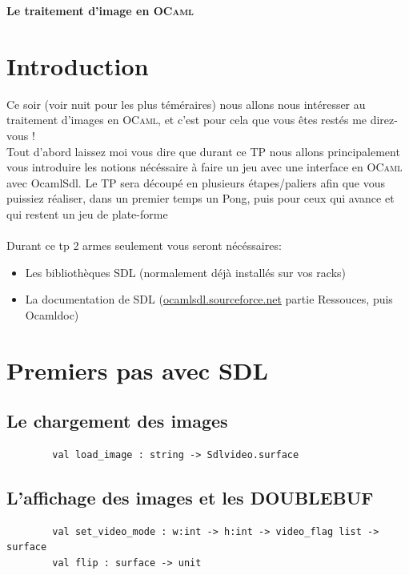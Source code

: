 \documentclass[a4paper]{article}
\begin{document}
\begin{center}
  {\Large {\bf Le traitement d'image en
  \textsc{OCaml}}}
\end{center}

\bigskip

\section*{Introduction}

Ce soir (voir nuit pour les plus téméraires) nous allons nous intéresser au traitement d'images en \textsc{OCaml}, et c'est pour cela que 
vous êtes restés me direz-vous !\\
Tout d'abord laissez moi vous dire que durant ce TP nous allons principalement vous introduire les
 notions nécéssaire à faire un jeu avec une interface en \textsc{OCaml} avec OcamlSdl.
Le TP sera découpé en plusieurs étapes/paliers afin que vous puissiez réaliser, dans un premier temps un Pong, puis pour ceux qui avance et qui restent un jeu de plate-forme\\\\
Durant ce tp 2 armes seulement vous seront nécéssaires:
\begin{itemize}
\item Les bibliothèques SDL (normalement déjà installés sur vos racks)
\item La documentation de SDL (\url{ocamlsdl.sourceforce.net} partie Ressouces, puis Ocamldoc)
\end{itemize}

\section{Premiers pas avec SDL}
	\subsection{Le chargement des images}
		\begin{verbatim}
		val load_image : string -> Sdlvideo.surface
		\end{verbatim}
	\subsection{L'affichage des images et les DOUBLEBUF}
		\begin{verbatim}
		val set_video_mode : w:int -> h:int -> video_flag list -> surface
		val flip : surface -> unit
		\end{verbatim}
\end{document}
